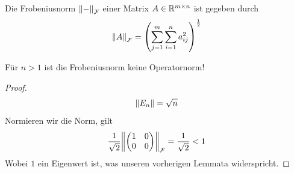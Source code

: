 \documentclass{report}
\begin{document}
\begin{example}
	Die Frobeniusnorm $\norm{-}_{\mathcal{F}}$ einer Matrix $A \in \mathbb{R}^{m \times n}$ ist gegeben durch
	\begin{align*}
		\norm{A}_{\mathcal{F}} = \left(\sum_{j = 1}^m \sum_{i = 1}^n a_{ij}^2\right)^\frac{1}{2}
	\end{align*}
\end{example}
\begin{lemma}
	Für $n > 1$ ist die Frobeniusnorm keine Operatornorm!
\end{lemma}
\begin{proof}
	\begin{align*}
			\norm{E_n} = \sqrt{n}
	\end{align*}
	Normieren wir die Norm, gilt
	\begin{align*}
		\frac{1}{\sqrt{2}}\norm{\begin{pmatrix}
				1 & 0\\
				0 & 0
		\end{pmatrix}}_{\mathcal{F}}
		=
		\frac{1}{\sqrt{2}}
		< 
		1
	\end{align*}
	Wobei $1$ ein Eigenwert ist, was unseren vorherigen Lemmata widerspricht.
\end{proof}
\end{document}
